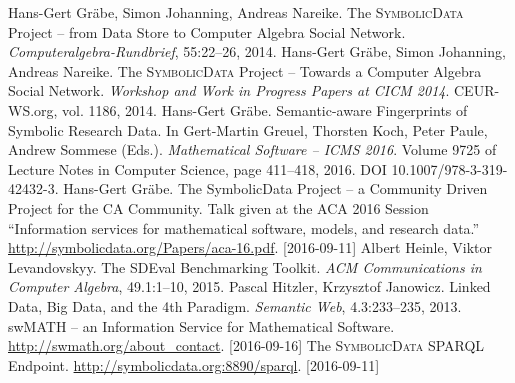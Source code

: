 \documentclass[a4paper,11pt]{article}
\def\SD{\textsc{SymbolicData}}
\begin{document}
\begin{thebibliography}{xxx}\raggedright
{} Hans-Gert Gr\"abe, Simon Johanning, Andreas Nareike.
  \newblock The {\SD} Project -- from Data Store to Computer Algebra Social
  Network. \newblock \emph{Computeralgebra-Rundbrief}, 55:22--26, 2014.
 Hans-Gert Gr\"abe, Simon Johanning, Andreas Nareike.
  \newblock The {\SD} Project -- Towards a Computer Algebra Social Network.
  \newblock \emph{Workshop and Work in Progress Papers at CICM 2014}.
  CEUR-WS.org, vol. 1186, 2014.
 Hans-Gert Gr\"abe. \newblock Semantic-aware Fingerprints of
  Symbolic Research Data. \newblock In Gert-Martin Greuel, Thorsten Koch, Peter
  Paule, Andrew Sommese (Eds.).  \emph{Mathematical Software -- ICMS 2016}.
  \newblock Volume 9725 of Lecture Notes in Computer Science, page 411--418,
  2016.  \newblock DOI 10.1007/978-3-319-42432-3.
 Hans-Gert Gr\"abe. \newblock The SymbolicData Project – a
  Community Driven Project for the CA Community.  \newblock Talk given at the
  ACA 2016 Session ``Information services for mathematical software, models,
  and research data.'' \newblock 
  \url{http://symbolicdata.org/Papers/aca-16.pdf}. [2016-09-11]
 Albert Heinle, Viktor Levandovskyy.  \newblock The SDEval
  Benchmarking Toolkit.  \newblock \emph{ACM Communications in Computer
    Algebra}, 49.1:1--10, 2015.
 Pascal Hitzler, Krzysztof Janowicz.  \newblock Linked
  Data, Big Data, and the 4th Paradigm.  \newblock \emph{Semantic Web},
  4.3:233--235, 2013.
 swMATH -- an Information Service for Mathematical Software.
  \newblock \url{http://swmath.org/about_contact}. [2016-09-16]
 The {\SD} SPARQL Endpoint. \newblock 
   \url{http://symbolicdata.org:8890/sparql}. [2016-09-11]

\end{thebibliography}
\end{document}
